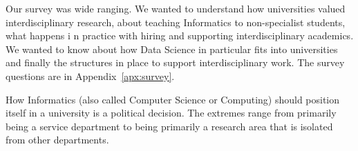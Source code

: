 \documentclass[11pt]{amsart}
\begin{document}
Our survey was wide ranging. We wanted to understand how universities valued interdisciplinary research, about teaching Informatics to non-specialist students, what happens i n practice with hiring and supporting interdisciplinary academics. We wanted to know about how Data Science in particular fits into universities and finally the structures in place to support interdisciplinary work. The survey questions are in Appendix~\ref{apx:survey}. 

How Informatics (also called Computer Science or Computing) should position itself in a university is a political decision. The extremes range from primarily being a service department to being primarily a research area that is isolated from other departments.





%



\end{document}
